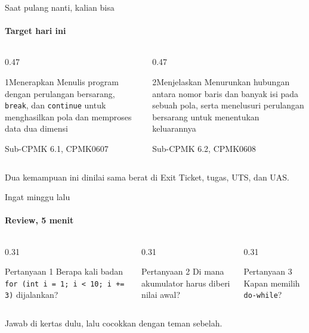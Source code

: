 \documentclass[t]{beamer}
\begin{document}
\begin{frame}{Saat pulang nanti, kalian bisa}
\framesubtitle{Target hari ini}
\begin{columns}[T]
\begin{column}{0.47\textwidth}
\begin{Langkah}{1}{Menerapkan}
Menulis program dengan perulangan bersarang, \texttt{break}, dan \texttt{continue} untuk menghasilkan pola dan memproses data dua dimensi

{\footnotesize\color{ITERAInkMuted}Sub-CPMK 6.1, CPMK0607}
\end{Langkah}
\end{column}
\begin{column}{0.47\textwidth}
\begin{Langkah}{2}{Menjelaskan}
Menurunkan hubungan antara nomor baris dan banyak isi pada sebuah pola, serta menelusuri perulangan bersarang untuk menentukan keluarannya

{\footnotesize\color{ITERAInkMuted}Sub-CPMK 6.2, CPMK0608}
\end{Langkah}
\end{column}
\end{columns}
\vspace{8pt}
\begin{Catatan}
Dua kemampuan ini dinilai sama berat di Exit Ticket, tugas, UTS, dan UAS.
\end{Catatan}
\end{frame}

\begin{frame}{Ingat minggu lalu}
\framesubtitle{Review, 5 menit}
\begin{columns}[T]
\begin{column}{0.31\textwidth}
\begin{BlokGelap}{Pertanyaan 1}
Berapa kali badan \texttt{for (int i = 1; i < 10; i += 3)} dijalankan?
\end{BlokGelap}
\end{column}
\begin{column}{0.31\textwidth}
\begin{BlokGelap}{Pertanyaan 2}
Di mana akumulator harus diberi nilai awal?
\end{BlokGelap}
\end{column}
\begin{column}{0.31\textwidth}
\begin{BlokGelap}{Pertanyaan 3}
Kapan memilih \texttt{do-while}?
\end{BlokGelap}
\end{column}
\end{columns}
\vspace{8pt}
Jawab di kertas dulu, lalu cocokkan dengan teman sebelah.
\end{frame}
\end{document}
